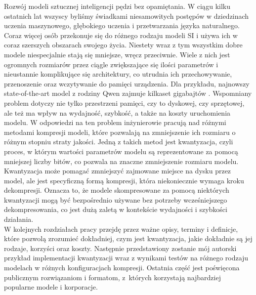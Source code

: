 Rozwój modeli sztucznej inteligencji pędzi bez opamiętania. W ciągu kilku ostatnich lat wszyscy byliśmy świadkami niesamowitych postępów w dziedzinach uczenia maszynowego, głębokiego uczenia i przetwarzania języka naturalnego. Coraz więcej osób przekonuje się do różnego rodzaju modeli SI i używa ich w coraz szerszych obszarach swojego życia. Niestety wraz z tym wszystkim dobre modele niespecjalnie stają się mniejsze, wręcz przeciwnie. Wiele z nich jest ogromnych rozmiarów przez ciągle zwiększające się ilości parametrów i nieustannie komplikujące się architektury, co utrudnia ich przechowywanie, przenoszenie oraz wczytywanie do pamięci urządzenia. Dla przykładu, najnowszy state-of-the-art model z rodziny Qwen zajmuje kilkaset gigabajtów \cite{qwen2025technical}. Wspomniany problem dotyczy nie tylko przestrzeni pamięci, czy to dyskowej, czy sprzętowej, ale też ma wpływ na wydajność, szybkość, a także na koszty uruchomienia modelu. W odpowiedzi na ten problem inżynierowie pracują nad różnymi metodami kompresji modeli, które pozwalają na zmniejszenie ich rozmiaru o różnym stopniu straty jakości. Jedną z takich metod jest kwantyzacja, czyli proces, w którym wartości parametrów modelu są reprezentowane za pomocą mniejszej liczby bitów, co pozwala na znaczne zmniejszenie rozmiaru modelu. Kwantyzacja może pomagać zmniejszyć zajmowane miejsce na dysku przez model, ale jest specyficzną formą kompresji, która niekoniecznie wymaga kroku dekompresji. Oznacza to, że modele skompresowane za pomocą niektórych kwantyzacji mogą być bezpośrednio używane bez potrzeby wcześniejszego dekompresowania, co jest dużą zaletą w kontekście wydajności i szybkości działania. \\

W kolejnych rozdziałach pracy przejdę przez ważne opisy, terminy i definicje, które pozwolą zrozumieć dokładniej, czym jest kwantyzacja, jakie dokładnie są jej rodzaje, korzyści oraz koszty. Następnie przedstawiony zostanie mój autorski przykład implementacji kwantyzacji wraz z wynikami testów na różnego rodzaju modelach w różnych konfiguracjach kompresji. Ostatnia część jest poświęcona publicznym rozwiązaniom i formatom, z~których korzystają najbardziej popularne modele i korporacje.